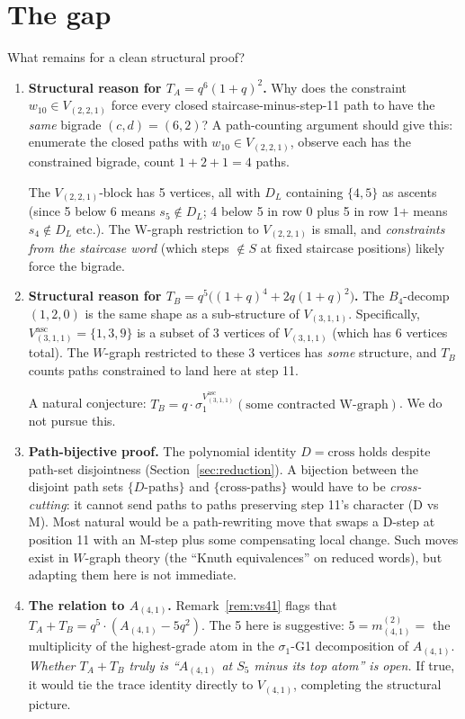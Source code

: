 \documentclass[11pt]{article}
\theoremstyle{definition}
\begin{document}
\section{The gap}\label{sec:gap}

What remains for a clean structural proof?

\begin{enumerate}[leftmargin=2em,topsep=0.3em,itemsep=0.2em]
\item \textbf{Structural reason for $T_A = q^6(1+q)^2$.} Why does the constraint $w_{10} \in V_{(2,2,1)}$ force every closed staircase-minus-step-11 path to have the \emph{same} bigrade $(c, d) = (6, 2)$? A path-counting argument should give this: enumerate the closed paths with $w_{10} \in V_{(2,2,1)}$, observe each has the constrained bigrade, count $1 + 2 + 1 = 4$ paths.

The $V_{(2,2,1)}$-block has 5 vertices, all with $D_L$ containing $\{4, 5\}$ as ascents (since 5 below 6 means $s_5 \notin D_L$; 4 below 5 in row 0 plus 5 in row 1+ means $s_4 \notin D_L$ etc.). The W-graph restriction to $V_{(2,2,1)}$ is small, and \emph{constraints from the staircase word} (which steps $\notin S$ at fixed staircase positions) likely force the bigrade.

\item \textbf{Structural reason for $T_B = q^5\bigl((1+q)^4 + 2q(1+q)^2\bigr)$.} The $B_4$-decomp $(1, 2, 0)$ is the same shape as a sub-structure of $V_{(3,1,1)}$. Specifically, $V_{(3,1,1)}^{\mathrm{asc}} = \{1, 3, 9\}$ is a subset of 3 vertices of $V_{(3,1,1)}$ (which has 6 vertices total). The $W$-graph restricted to these 3 vertices has \emph{some} structure, and $T_B$ counts paths constrained to land here at step 11.

A natural conjecture: $T_B = q \cdot \sigma_1^{V_{(3,1,1)}^{\mathrm{asc}}}(\text{some contracted W-graph})$. We do not pursue this.

\item \textbf{Path-bijective proof.} The polynomial identity $D = \mathrm{cross}$ holds despite path-set disjointness (Section~\ref{sec:reduction}). A bijection between the disjoint path sets $\{D\text{-paths}\}$ and $\{\mathrm{cross}\text{-paths}\}$ would have to be \emph{cross-cutting}: it cannot send paths to paths preserving step 11's character (D vs M). Most natural would be a path-rewriting move that swaps a D-step at position 11 with an M-step plus some compensating local change. Such moves exist in $W$-graph theory (the ``Knuth equivalences'' on reduced words), but adapting them here is not immediate.

\item \textbf{The relation to $A_{(4,1)}$.} Remark~\ref{rem:vs41} flags that $T_A + T_B = q^5 \cdot (A_{(4,1)} - 5q^2)$. The 5 here is suggestive: $5 = m_{(4,1)}^{(2)} = $ the multiplicity of the highest-grade atom in the $\sigma_1$-G1 decomposition of $A_{(4,1)}$. \emph{Whether $T_A + T_B$ truly is ``$A_{(4,1)}$ at $S_5$ minus its top atom'' is open.} If true, it would tie the trace identity directly to $V_{(4,1)}$, completing the structural picture.
\end{enumerate}
\end{document}
